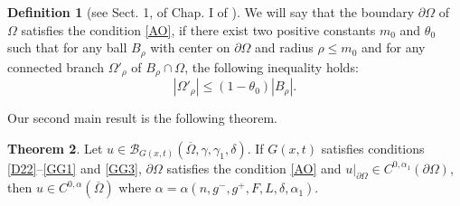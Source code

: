\documentclass[10pt,reqno]{amsart}
\newcommand *\w{^\wedge}
\theoremstyle{definition}
\newtheorem{theorem}{Theorem}[section]
\newtheorem{definition}[theorem]{Definition}
\numberwithin{equation}{section}
\begin{document}
\begin{definition}[see Sect. 1, of Chap. I of \cite{OL}]\label{Definition 2.4}
We will say that the boundary \(\partial \Omega\) of \(\Omega\) satisfies the condition \eqref{AO}, if there exist two positive constants \(m_0\) and \(\theta_0\) such that for any ball \(B_\rho\) with center on \(\partial \Omega\) and radius \(\rho \leq m_0\) and for any connected branch \(\Omega'_\rho\) of \(B_\rho \cap \Omega\), the following inequality hol{\rm d}s:
\begin{equation}\label{AO}
|\Omega'_\rho| \leq (1 - \theta_0)|B_\rho|.\tag{A}
\end{equation}
\end{definition}
Our second main result is the following theorem.
\begin{theorem}\label{Theorem 2.2}
Let \(u \in \mathcal{B}_{G(x,t)}(\overline{\Omega}, \gamma, \gamma_1, \delta)\). If \(G(x,t)\) satisfies conditions \eqref{D22}--\eqref{GG1} and \eqref{GG3}, \(\partial \Omega\) satisfies the condition \eqref{AO} and \(u|_{\partial \Omega} \in C^{0,\alpha_1}(\partial \Omega)\), then \(u \in C^{0,\alpha}(\overline{\Omega})\) where \(\alpha = \alpha(n, g^-, g^+, F, L, \delta, \alpha_1)\).
\end{theorem}
\end{document}
